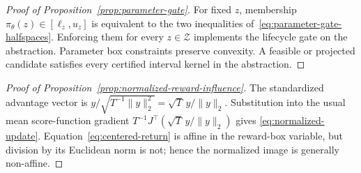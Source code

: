 \begin{proof}[Proof of Proposition~\ref{prop:parameter-gate}]
For fixed $z$, membership $\pi_\theta(z)\in[\ell_z,u_z]$ is equivalent to the
two inequalities of~\eqref{eq:parameter-gate-halfspaces}.  Enforcing them for every $z\in\mathcal Z$ implements
the lifecycle gate on the abstraction.  Parameter box constraints preserve
convexity.  A feasible or projected candidate satisfies every certified
interval kernel in the abstraction.
\end{proof}

\begin{proof}[Proof of Proposition~\ref{prop:normalized-reward-influence}]
The standardized advantage vector is
$y/\sqrt{T^{-1}\|y\|_2^2}=\sqrt T\,y/\|y\|_2$.  Substitution into the usual
mean score-function gradient
$T^{-1}J^\top(\sqrt T\,y/\|y\|_2)$ gives
\eqref{eq:normalized-update}.  Equation~\eqref{eq:centered-return} is affine
in the reward-box variable, but division by its Euclidean norm is not;
hence the normalized image is generally non-affine.
\end{proof}
